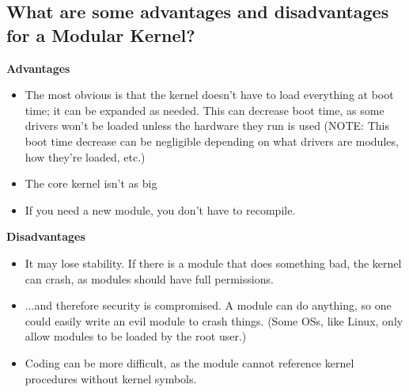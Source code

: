 \documentclass{42-en}
\begin{document}
    \subsection{What are some advantages and disadvantages for a Modular Kernel?}
    \textbf{Advantages}
    \begin{itemize}\itemsep1pt
        \item The most obvious is that the kernel doesn't have to load
        everything at boot time; it can be expanded as needed. This can
        decrease boot time, as some drivers won't be loaded unless the hardware
        they run is used (NOTE: This boot time decrease can be negligible
        depending on what drivers are modules, how they're loaded, etc.)
        \item The core kernel isn't as big
        \item If you need a new module, you don't have to recompile.
    \end{itemize}
    \textbf{Disadvantages}
    \begin{itemize}\itemsep1pt
        \item It may lose stability. If there is a module that does something
        bad, the kernel can crash, as modules should have full permissions.
        \item ...and therefore security is compromised. A module can do
        anything, so one could easily write an evil module to crash things.
        (Some OSs, like Linux, only allow modules to be loaded by the root
        user.)
        \item Coding can be more difficult, as the module cannot reference
        kernel procedures without kernel symbols.
    \end{itemize}
\end{document}
